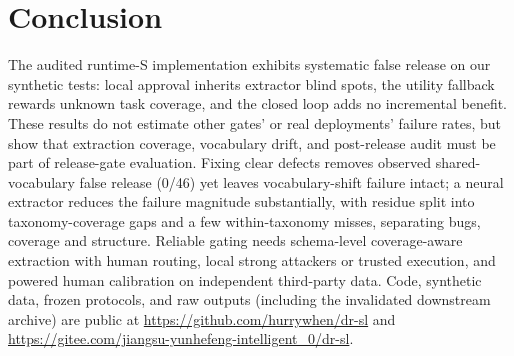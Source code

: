 \documentclass[conference]{IEEEtran}
\begin{document}
\section{Conclusion}
The audited runtime-S implementation exhibits systematic false release on our synthetic tests: local approval inherits extractor blind spots, the utility fallback rewards unknown task coverage, and the closed loop adds no incremental benefit. These results do not estimate other gates' or real deployments' failure rates, but show that extraction coverage, vocabulary drift, and post-release audit must be part of release-gate evaluation. Fixing clear defects removes observed shared-vocabulary false release (0/46) yet leaves vocabulary-shift failure intact; a neural extractor reduces the failure magnitude substantially, with residue split into taxonomy-coverage gaps and a few within-taxonomy misses, separating bugs, coverage and structure. Reliable gating needs schema-level coverage-aware extraction with human routing, local strong attackers or trusted execution, and powered human calibration on independent third-party data. Code, synthetic data, frozen protocols, and raw outputs (including the invalidated downstream archive) are public at \url{https://github.com/hurrywhen/dr-sl} and \url{https://gitee.com/jiangsu-yunhefeng-intelligent_0/dr-sl}.
\end{document}
